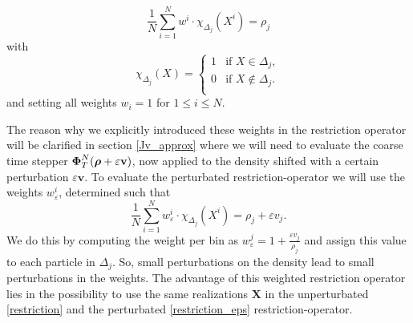 \begin{equation}
\frac{1}{N} \sum_{i=1}^{N}  w^i \cdot \chi_{\Delta_j}(X^i) = \rho_j  \label{restriction}
\end{equation}
with 
\begin{equation}
\chi_{\Delta_j}(X) = \begin{cases}
  1 & \mbox{if } X \in \Delta_j, \\
  0 & \mbox{if } X \notin \Delta_j. \\
\end{cases}
\end{equation}
and setting all weights $w_i =1 $ for $1\leq i \leq N$.

The reason why we explicitly introduced these weights in the restriction operator will be clarified in section \ref{Jv_approx} where we will need to evaluate  the coarse time stepper  $\boldsymbol{\Phi}^N_T (\boldsymbol{\rho} + \varepsilon \mathbf{v})$, now applied to the density shifted with a certain perturbation $\varepsilon \mathbf{v}$. %
To evaluate the perturbated restriction-operator we will use the weights $ w^i_{\varepsilon}$, determined such that
\begin{equation}
\frac{1}{N} \sum_{i=1}^{N}  w^i_{\varepsilon} \cdot \chi_{\Delta_j} (X^i) = \rho_j + \varepsilon v_j . \label{restriction_eps}
\end{equation}
We do this by computing the weight per bin as $ w^j_{\varepsilon} = 1+ \frac{\varepsilon v_j}{\rho_j}$ and assign this value to each particle in $\Delta_j$. So, small perturbations on the density lead to small perturbations in the weights. The advantage of this weighted restriction operator lies in the possibility to use the same realizations $\mathbf{X}$ in the unperturbated \eqref{restriction} and the perturbated  \eqref{restriction_eps} restriction-operator.
